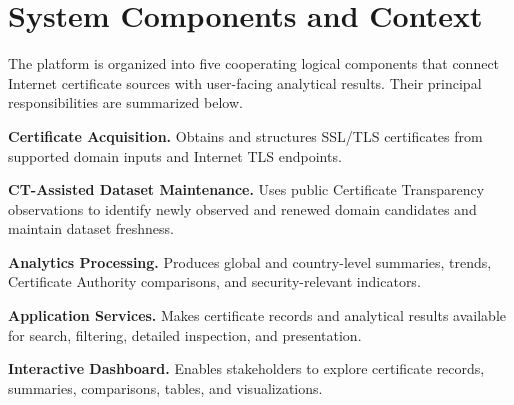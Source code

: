 \section{System Components and Context}
\label{sec:system-context}

The platform is organized into five cooperating logical components that connect
Internet certificate sources with user-facing analytical results. Their
principal responsibilities are summarized below.

\noindent\textbf{Certificate Acquisition.}
Obtains and structures SSL/TLS certificates from supported domain inputs and
Internet TLS endpoints.

\noindent\textbf{CT-Assisted Dataset Maintenance.}
Uses public Certificate Transparency observations to identify newly observed
and renewed domain candidates and maintain dataset freshness.

\noindent\textbf{Analytics Processing.}
Produces global and country-level summaries, trends, Certificate Authority
comparisons, and security-relevant indicators.

\noindent\textbf{Application Services.}
Makes certificate records and analytical results available for search,
filtering, detailed inspection, and presentation.

\noindent\textbf{Interactive Dashboard.}
Enables stakeholders to explore certificate records, summaries, comparisons,
tables, and visualizations.

